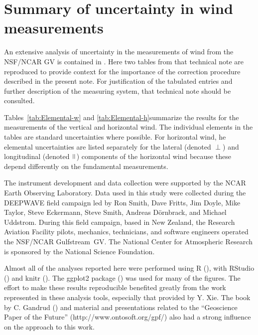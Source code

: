 \documentclass[english,british,amtd,bookmarks=false,unicode=true]{copernicus}\usepackage[]{graphicx}\usepackage[]{color}
\begin{document}
\appendix%


\section{Summary of uncertainty in wind measurements}

An extensive analysis of uncertainty in the measurements of wind
from the NSF/NCAR GV is contained in \citet{Cooper2016ncartn}. Here
two tables from that technical note are reproduced to provide context
for the importance of the correction procedure described in the present
note. For justification of the tabulated entries and further description
of the measuring system, that technical note should be consulted.

Tables~\ref{tab:Elemental-w} and \ref{tab:Elemental-h}summarize
the results for the measurements of the vertical and horizontal wind.
The individual elements in the tables are standard uncertainties where
possible. For horizontal wind, he elemental uncertainties are listed
separately for the lateral (denoted $\perp$) and longitudinal (denoted
$\mkern3mu\vphantom{\perp}\vrule depth0pt\mkern3mu\vrule depth0pt\mkern3mu$)
components of the horizontal wind because these depend differently
on the fundamental measurements.
\begin{acknowledgements}
The instrument development and data collection were supported by the
NCAR Earth Observing Laboratory. Data used in this study were collected
during the DEEPWAVE field campaign led by Ron Smith, Dave Fritts,
Jim Doyle, Mike Taylor, Steve Eckermann, Steve Smith, Andreas D\"ornbrack,
and Michael Uddstrom. During this field campaign, based in New Zealand,
the Research Aviation Facility pilots, mechanics, technicians, and
software engineers operated the NSF/NCAR Gulfstream~GV. The National
Center for Atmospheric Research is sponsored by the National Science
Foundation. 

Almost all of the analyses reported here were performed using R (\citet{Rlanguage}),
with RStudio (\citet{RStudio2012}) and knitr (\citet{Xie2014a,Xie2014b}).
The \textquotedbl{}ggplot2\textquotedbl{} package (\citet{wickham2009})
was used for many of the figures. The effort to make these results
reproducible benefited greatly from the work represented in these
analysis tools, especially that provided by Y. Xie. The book by C.
Gandrud (\citet{Gandrud2014}) and material and presentations related
to the ``Geoscience Paper of the Future'' (http://www.ontosoft.org/gpf/)
also had a strong influence on the approach to this work.

\clearpage
\end{acknowledgements}


\end{document}
